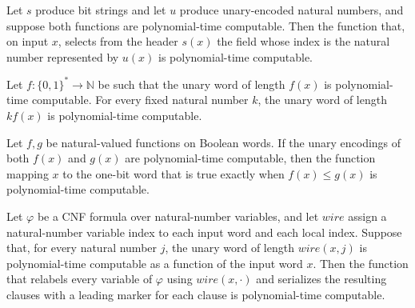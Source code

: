 \begin{lemma}
\label{Complexity.clA5Field_native}
\leanok
{}
Let $s$ produce bit strings and let $u$ produce unary-encoded natural numbers, and
suppose both functions are polynomial-time computable. Then the function that, on input
$x$, selects from the header $s(x)$ the field whose index is the natural number
represented by $u(x)$ is polynomial-time computable.
\end{lemma}

\begin{lemma}
\label{Complexity.clA5Times_native}
\leanok
{}
Let $f:\{0,1\}^*\to\mathbb{N}$ be such that the unary word of length $f(x)$ is
polynomial-time computable. For every fixed natural number $k$, the unary word of length
$k f(x)$ is polynomial-time computable.
\end{lemma}

\begin{lemma}
\label{Complexity.clA5Le_native}
\leanok
{}
Let $f,g$ be natural-valued functions on Boolean words. If the unary encodings of both
$f(x)$ and $g(x)$ are polynomial-time computable, then the function mapping $x$ to the
one-bit word that is true exactly when $f(x)\le g(x)$ is polynomial-time computable.
\end{lemma}

\begin{lemma}
\label{Complexity.clA5Template_native}
\leanok
{}
Let $\varphi$ be a CNF formula over natural-number variables, and let $wire$ assign a
natural-number variable index to each input word and each local index. Suppose that, for
every natural number $j$, the unary word of length $wire(x,j)$ is polynomial-time
computable as a function of the input word $x$. Then the function that relabels every
variable of $\varphi$ using $wire(x,\cdot)$ and serializes the resulting clauses with a
leading marker for each clause is polynomial-time computable.
\end{lemma}

